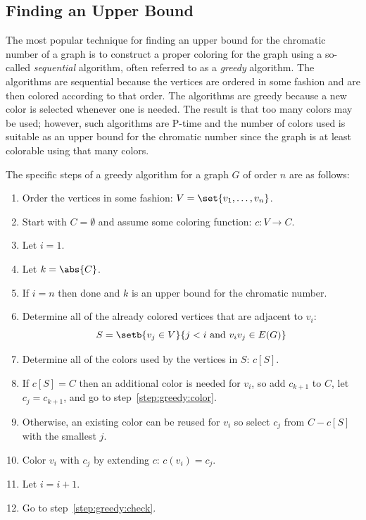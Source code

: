 \subsection{Finding an Upper Bound}\label{sec:sub:upper}

The most popular technique for finding an upper bound for the chromatic number of a graph is to construct a proper
coloring for the graph using a so-called \emph{sequential} algorithm, often referred to as a \emph{greedy}
algorithm.  The algorithms are sequential because the vertices are ordered in some fashion and are then colored
according to that order.  The algorithms are greedy because a new color is selected whenever one is needed.  The
result is that too many colors may be used; however, such algorithms are P-time and the number of colors used is
suitable as an upper bound for the chromatic number since the graph is at least colorable using that many colors.

The specific steps of a greedy algorithm for a graph \(G\) of order \(n\) are as follows:
\begin{enumerate}
\item Order the vertices in some fashion: \(V=\set{v_1,\ldots,v_n}\).
\item Start with \(C=\emptyset\) and assume some coloring function: \(c:V\to C\).
\item Let \(i=1\).
\item\label{step:greedy:check} Let \(k=\abs{C}\).
\item If \(i=n\) then done and \(k\) is an upper bound for the chromatic number.
\item Determine all of the already colored vertices that are adjacent to \(v_i\):
  \[S=\setb{v_j\in V}{j<i\ \text{and}\ v_iv_j\in E(G)}\]
\item Determine all of the colors used by the vertices in \(S\): \(c[S]\).
\item If \(c[S]=C\) then an additional color is needed for \(v_i\), so add \(c_{k+1}\) to \(C\), let
  \(c_j=c_{k+1}\), and go to step~\ref{step:greedy:color}.
\item Otherwise, an existing color can be reused for \(v_i\) so select \(c_j\) from \(C-c[S]\) with the smallest
  \(j\).
\item\label{step:greedy:color} Color \(v_i\) with \(c_j\) by extending \(c\): \(c(v_i)=c_j\).
\item Let \(i=i+1\).
\item Go to step~\ref{step:greedy:check}.
\end{enumerate}

